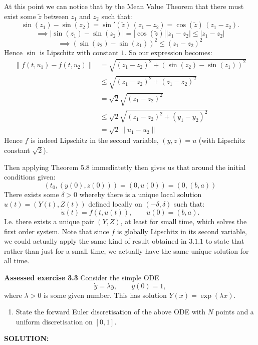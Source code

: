 \documentclass[]{article}
\begin{document}
\noindent At this point we can notice that by the Mean Value Theorem that there must exist some $\tilde{z}$ between $z_1$ and $z_2$ such that:
\[
\sin(z_1) - \sin(z_2) = \sin'(\tilde z)\,(z_1 - z_2) = \cos(\tilde z)\,(z_1 - z_2).
\]
\[\implies |\sin(z_1)-\sin(z_2)| = | \cos(\tilde z)||z_1-z_2| \leq |z_1-z_2|
\]
\[
\implies (\sin(z_2)-\sin(z_1))^2 \leq (z_1-z_2)^2
\]
\noindent Hence $\sin$ is Lipschitz with constant $1$. So our expression becomes:
\begin{align*}
    \|f(t,u_1)-f(t,u_2)\| &= \sqrt{(z_1-z_2)^2+(\sin(z_2)-\sin(z_1))^2}\\
    &\leq \sqrt{(z_1-z_2)^2+(z_1-z_2)^2}\\
    &= \sqrt{2}\sqrt{(z_1-z_2)^2}\\
    &\leq \sqrt{2}\sqrt{(z_1-z_2)^2+(y_1-y_2)^2}\\
    &=\sqrt{2}\|u_1-u_2\|
\end{align*}
\noindent Hence $f$ is indeed Lipschitz in the second variable, $(y,z) = u$ (with Lipschitz constant $\sqrt{2}$).\newline

\noindent Then applying Theorem 5.8 immediatetly then gives us that around the initial conditions given:
\[
\left(t_0,(y(0),z(0))\right) = (0,u(0)) = (0,(b,a))
\]
There exists some $\delta>0$ whereby there is a unique local solution $u(t) = (Y(t),Z(t))$ defined locally on $ (-\delta,\delta)$ such that:
\[
\dot{u}(t) = f\left(t,u(t)\right),\qquad u(0) = (b,a).
\]
\noindent I.e. there exists a unique pair $(Y,Z)$, at least for small time, which solves the first order system. Note that since $f$ is globally Lipschitz in its second variable, we could actually apply the same kind of result obtained in $3.1.1$ to state that rather than just for a small time, we actually have the same unique solution for all time.\newline

\newpage

\noindent\textbf{Assessed exercise 3.3}
Consider the simple ODE
\[
\dot y=\lambda y,\qquad y(0)=1,
\]
where $\lambda>0$ is some given number. This has solution $Y(x)=\exp(\lambda x)$.
\begin{enumerate}
\item State the forward Euler discretisation of the above ODE with $N$ points and a uniform discretisation on $[0,1]$.
\end{enumerate}

\noindent\textbf{SOLUTION:}\newline
\end{document}
